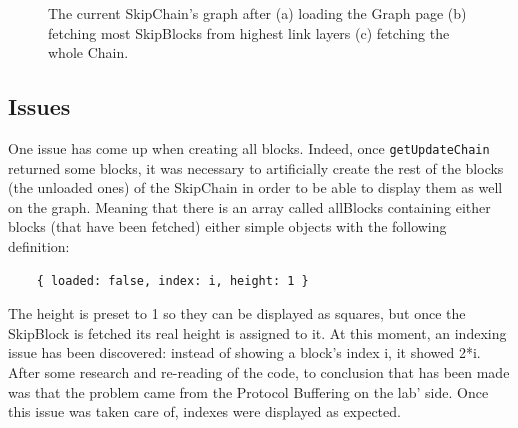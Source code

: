 \documentclass[11pt, a4paper, twoside, openright]{article} %
\begin{document}
{\begin{figure}[htp]

\caption{The current SkipChain's graph after (a) loading the Graph page (b) fetching most SkipBlocks from highest link layers (c) fetching the whole Chain.}
\label{fig:main}

\end{figure}
\newpage
\subsection{Issues}
One issue has come up when creating all blocks. Indeed, once \verb|getUpdateChain| returned some blocks, it was necessary to artificially create the rest of the blocks (the unloaded ones) of the SkipChain in order to be able to display them as well on the graph. Meaning that there is an array called allBlocks containing either blocks (that have been fetched) either simple objects with the following definition:
\begin{lstlisting}
    { loaded: false, index: i, height: 1 }
\end{lstlisting}
The height is preset to 1 so they can be displayed as squares, but once the SkipBlock is fetched its real height is assigned to it.
At this moment, an indexing issue has been discovered: instead of showing a block's index i, it showed 2*i. After some research and re-reading of the code, to conclusion that has been made was that the problem came from the Protocol Buffering on the lab' side. Once this issue was taken care of, indexes were displayed as expected.

}
\end{document}
